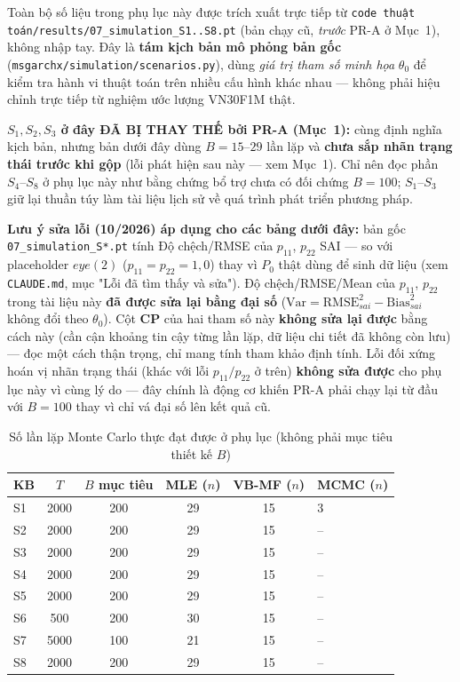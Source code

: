\documentclass[11pt,a4paper]{article}
\begin{document}
Toàn bộ số liệu trong phụ lục này được trích xuất trực tiếp từ
\texttt{code thuật toán/results/07\_simulation\_S1..S8.pt} (bản chạy cũ, \emph{trước}
PR-A ở Mục~1), không nhập tay. Đây là \textbf{tám kịch bản mô phỏng bản gốc}
(\texttt{msgarchx/simulation/scenarios.py}), dùng \emph{giá trị tham số minh họa}
$\theta_0$ để kiểm tra hành vi thuật toán trên nhiều cấu hình khác nhau --- không
phải hiệu chỉnh trực tiếp từ nghiệm ước lượng VN30F1M thật.

\textbf{$S_1,S_2,S_3$ ở đây ĐÃ BỊ THAY THẾ bởi PR-A (Mục~1):} cùng định nghĩa
kịch bản, nhưng bản dưới đây dùng $B=15$--$29$ lần lặp và \textbf{chưa sắp nhãn
trạng thái trước khi gộp} (lỗi phát hiện sau này --- xem Mục~1). Chỉ nên đọc phần
$S_4$--$S_8$ ở phụ lục này như bằng chứng bổ trợ chưa có đối chứng $B=100$; $S_1$--$S_3$
giữ lại thuần túy làm tài liệu lịch sử về quá trình phát triển phương pháp.

\textbf{Lưu ý sửa lỗi (10/2026) áp dụng cho các bảng dưới đây:} bản gốc
\texttt{07\_simulation\_S*.pt} tính Độ chệch/RMSE của $p_{11}$, $p_{22}$ SAI ---
so với placeholder $eye(2)$ ($p_{11}=p_{22}=1{,}0$) thay vì $P_0$ thật dùng để sinh
dữ liệu (xem \texttt{CLAUDE.md}, mục "Lỗi đã tìm thấy và sửa"). Độ chệch/RMSE/Mean
của $p_{11}$, $p_{22}$ trong tài liệu này \textbf{đã được sửa lại bằng đại số}
($\mathrm{Var}=\mathrm{RMSE}_{sai}^2-\mathrm{Bias}_{sai}^2$ không đổi theo
$\theta_0$). Cột \textbf{CP} của hai tham số này \textbf{không sửa lại được} bằng
cách này (cần cận khoảng tin cậy từng lần lặp, dữ liệu chi tiết đã không còn lưu)
--- đọc một cách thận trọng, chỉ mang tính tham khảo định tính. Lỗi đối xứng hoán
vị nhãn trạng thái (khác với lỗi $p_{11}/p_{22}$ ở trên) \textbf{không sửa được}
cho phụ lục này vì cùng lý do --- đây chính là động cơ khiến PR-A phải chạy lại
từ đầu với $B=100$ thay vì chỉ vá đại số lên kết quả cũ.

\begin{table}[H]
\centering\footnotesize
\caption{Số lần lặp Monte Carlo thực đạt được ở phụ lục (không phải mục tiêu thiết kế $B$)}
\begin{tabularx}{\textwidth}{l C C C C L}
\toprule
\textbf{KB} & \textbf{$T$} & \textbf{$B$ mục tiêu} & \textbf{MLE ($n$)} & \textbf{VB-MF ($n$)} & \textbf{MCMC ($n$)} \\
\midrule

S1 & 2000 & 200 & 29 & 15 & 3 \\
S2 & 2000 & 200 & 29 & 15 & -- \\
S3 & 2000 & 200 & 29 & 15 & -- \\
S4 & 2000 & 200 & 29 & 15 & -- \\
S5 & 2000 & 200 & 29 & 15 & -- \\
S6 & 500 & 200 & 30 & 15 & -- \\
S7 & 5000 & 100 & 21 & 15 & -- \\
S8 & 2000 & 200 & 29 & 15 & -- \\
\bottomrule
\end{tabularx}
\end{table}
\end{document}
